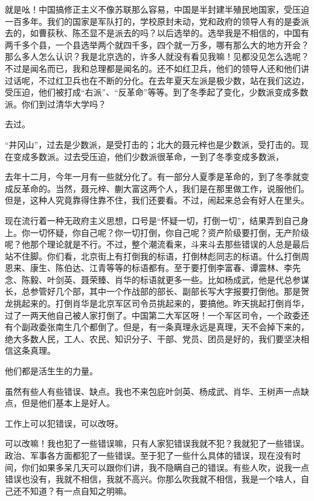 就是吆！中国搞修正主义不像苏联那么容易，中国是半封建半殖民地国家，受压迫一百多年。我们的国家是军队打的，学校原封未动，党和政府的领导人有的是委派去的，如曹荻秋、陈丕显不是派去的吗？以后选举的。选举我是不相信的，中国有两千多个县，一个县选举两个就四千多，四个就一万多，哪有那么大的地方开会？那么多人怎么认识？我是北京选的，许多人就没有看见我嘛！见都没见怎么选呢？不过是闻名而已，我和总理都是闻名的。还不如红卫兵，他们的领导人还和他们讲过话呢，不过红卫兵也在不断的分化。在去年夏天左派是极少数，站在我们这边，受压迫，他们被打成“右派”、“反革命”等等。到了冬季起了变化，少数派变成多数派。你们到过清华大学吗？

去过。

“井冈山”，过去是少数派，是受打击的；北大的聂元梓也是少数派，受打击的。现在变成多数派。过去受压迫，他们少数派很革命，一到了冬季变成多数派，

去年十二月，今年一月有一些就分化了。有一部分人夏季是革命的，到了冬季就变成反革命的。当然，聂元梓、蒯大富这两个人，我们是在那里做工作，说服他们。但是，这种人究竟靠得住靠不住，我们还要看。不过，闹起来总会有好人在里头。

现在流行着一种无政府主义思想，口号是“怀疑一切，打倒一切”，结果弄到自己身上。你一切怀疑，你自己呢？你一切打倒，你自己呢？资产阶级要打倒，无产阶级呢？他那个理论就是不行。不过，整个潮流看来，斗来斗去那些错误的人总是最后站不住脚。你们看，北京街上有打倒我的标语，打倒林彪同志的标语。什么打倒周恩来、康生、陈伯达、江青等等的标语都有。至于要打倒李富春、谭震林、李先念、陈毅、叶剑英、聂荣臻、肖华的标语就更多一些。比如杨成武，他是代总参谋长，总参管好几个部，其中一个作战部的部长、副部长写大字报要打倒他。那是贺龙挑起来的。打倒肖华是北京军区司令员挑起来的，要搞他。昨天挑起打倒肖华，过了一两天他自己被人家打倒了。中国第二大军区呀！一个军区司令，一个政委还有个副政委张南生几个都倒了。但是，有一条真理永远是真理，天不会掉下来的，绝大多数人民，工人、农民、知识分子、干部、党员、团员是好的，我们要坚决相信这条真理。

他们都是活生生的力量。

虽然有些人有些错误、缺点。我也不来包庇叶剑英、杨成武、肖华、王树声一点缺点，但是他们基本上是好人。

工作上可以犯错误，可以改呀。

可以改嘛！我也犯了一些错误嘛，只有人家犯错误我就不犯？我就犯了一些错误。政治、军事各方面都犯了一些错误。至于犯了一些什么具体的错误，现在没有时间，你们如果多呆几天可以跟你们讲，我不隐瞒自己的错误。有些人吹，说我一点错误也没有，我就不相信，我就不高兴。你那么吹我就不相信，我是一个啥人，自己还不知道？有一点自知之明嘛。

